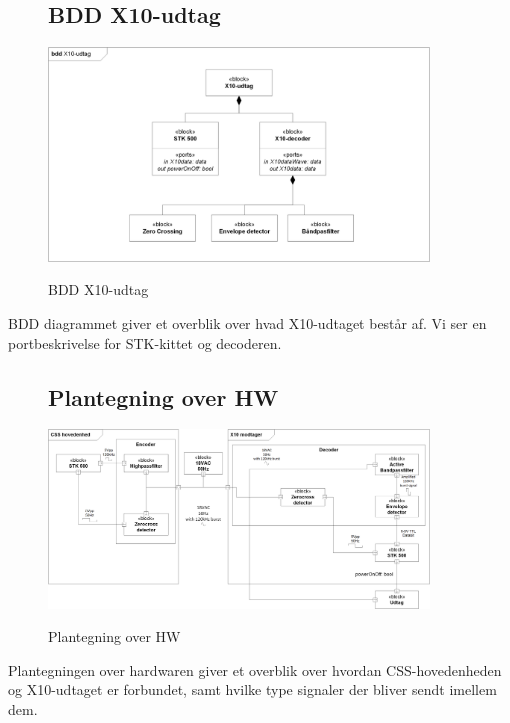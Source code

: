 \begin{figure}[H] \centering
\subsection{BDD X10-udtag}
{\includegraphics[width=0.9\textwidth]{billeder/diagrammer/BDD_Modtager}}
\caption{BDD X10-udtag}
\label{lab:bddmodtager}
\raggedright
\end{figure}
BDD diagrammet giver et overblik over hvad X10-udtaget består af. Vi ser en portbeskrivelse for STK-kittet og decoderen.

\begin{figure}[H] \centering
\subsection{Plantegning over HW}
{\includegraphics[width=0.9\textwidth]{billeder/diagrammer/Plantegning_over_HW}}
\caption{Plantegning over HW}
\label{lab:Plantegning over HW}
\raggedright
\end{figure}
Plantegningen over hardwaren giver et overblik over hvordan CSS-hovedenheden og X10-udtaget er forbundet, samt hvilke type signaler der bliver sendt imellem dem.

